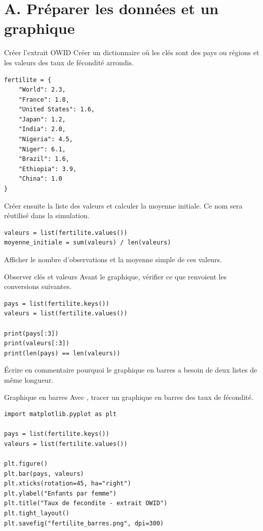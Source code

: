 \documentclass[11pt,a4paper]{article}
\begin{document}
\section*{A. Préparer les données et un graphique}

\begin{mandatoryexercise}{Créer l'extrait OWID}
Créer un dictionnaire où les clés sont des pays ou régions et les valeurs des taux de fécondité arrondis.
\begin{lstlisting}
fertilite = {
    "World": 2.3,
    "France": 1.8,
    "United States": 1.6,
    "Japan": 1.2,
    "India": 2.0,
    "Nigeria": 4.5,
    "Niger": 6.1,
    "Brazil": 1.6,
    "Ethiopia": 3.9,
    "China": 1.0
}
\end{lstlisting}
Créer ensuite la liste des valeurs et calculer la moyenne initiale. Ce nom sera réutilisé dans la simulation.
\begin{lstlisting}
valeurs = list(fertilite.values())
moyenne_initiale = sum(valeurs) / len(valeurs)
\end{lstlisting}
Afficher le nombre d'observations et la moyenne simple de ces valeurs.
\end{mandatoryexercise}

\begin{mandatoryexercise}{Observer clés et valeurs}
Avant le graphique, vérifier ce que renvoient les conversions suivantes.
\begin{lstlisting}
pays = list(fertilite.keys())
valeurs = list(fertilite.values())

print(pays[:3])
print(valeurs[:3])
print(len(pays) == len(valeurs))
\end{lstlisting}
Écrire en commentaire pourquoi le graphique en barres a besoin de deux listes de même longueur.
\end{mandatoryexercise}

\begin{mandatoryexercise}{Graphique en barres}
Avec , tracer un graphique en barres des taux de fécondité.
\begin{lstlisting}
import matplotlib.pyplot as plt

pays = list(fertilite.keys())
valeurs = list(fertilite.values())

plt.figure()
plt.bar(pays, valeurs)
plt.xticks(rotation=45, ha="right")
plt.ylabel("Enfants par femme")
plt.title("Taux de fecondite - extrait OWID")
plt.tight_layout()
plt.savefig("fertilite_barres.png", dpi=300)
\end{lstlisting}
\end{mandatoryexercise}
\end{document}
